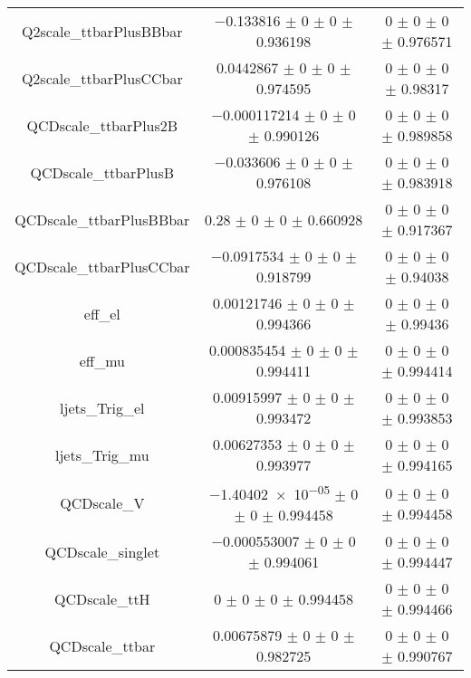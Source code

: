 \begin{table}
\begin{tabular}{ccc}
Q2scale\_ttbarPlusBBbar & \num{-0.133816} $\pm$ \num{0} $\pm$ \num{0} $\pm$ \num{0.936198} & \num{0} $\pm$ \num{0} $\pm$ \num{0} $\pm$ \num{0.976571}\\
Q2scale\_ttbarPlusCCbar & \num{0.0442867} $\pm$ \num{0} $\pm$ \num{0} $\pm$ \num{0.974595} & \num{0} $\pm$ \num{0} $\pm$ \num{0} $\pm$ \num{0.98317}\\
QCDscale\_ttbarPlus2B & \num{-0.000117214} $\pm$ \num{0} $\pm$ \num{0} $\pm$ \num{0.990126} & \num{0} $\pm$ \num{0} $\pm$ \num{0} $\pm$ \num{0.989858}\\
QCDscale\_ttbarPlusB & \num{-0.033606} $\pm$ \num{0} $\pm$ \num{0} $\pm$ \num{0.976108} & \num{0} $\pm$ \num{0} $\pm$ \num{0} $\pm$ \num{0.983918}\\
QCDscale\_ttbarPlusBBbar & \num{0.28} $\pm$ \num{0} $\pm$ \num{0} $\pm$ \num{0.660928} & \num{0} $\pm$ \num{0} $\pm$ \num{0} $\pm$ \num{0.917367}\\
QCDscale\_ttbarPlusCCbar & \num{-0.0917534} $\pm$ \num{0} $\pm$ \num{0} $\pm$ \num{0.918799} & \num{0} $\pm$ \num{0} $\pm$ \num{0} $\pm$ \num{0.94038}\\
eff\_el & \num{0.00121746} $\pm$ \num{0} $\pm$ \num{0} $\pm$ \num{0.994366} & \num{0} $\pm$ \num{0} $\pm$ \num{0} $\pm$ \num{0.99436}\\
eff\_mu & \num{0.000835454} $\pm$ \num{0} $\pm$ \num{0} $\pm$ \num{0.994411} & \num{0} $\pm$ \num{0} $\pm$ \num{0} $\pm$ \num{0.994414}\\
ljets\_Trig\_el & \num{0.00915997} $\pm$ \num{0} $\pm$ \num{0} $\pm$ \num{0.993472} & \num{0} $\pm$ \num{0} $\pm$ \num{0} $\pm$ \num{0.993853}\\
ljets\_Trig\_mu & \num{0.00627353} $\pm$ \num{0} $\pm$ \num{0} $\pm$ \num{0.993977} & \num{0} $\pm$ \num{0} $\pm$ \num{0} $\pm$ \num{0.994165}\\
QCDscale\_V & \num{-1.40402e-05} $\pm$ \num{0} $\pm$ \num{0} $\pm$ \num{0.994458} & \num{0} $\pm$ \num{0} $\pm$ \num{0} $\pm$ \num{0.994458}\\
QCDscale\_singlet & \num{-0.000553007} $\pm$ \num{0} $\pm$ \num{0} $\pm$ \num{0.994061} & \num{0} $\pm$ \num{0} $\pm$ \num{0} $\pm$ \num{0.994447}\\
QCDscale\_ttH & \num{0} $\pm$ \num{0} $\pm$ \num{0} $\pm$ \num{0.994458} & \num{0} $\pm$ \num{0} $\pm$ \num{0} $\pm$ \num{0.994466}\\
QCDscale\_ttbar & \num{0.00675879} $\pm$ \num{0} $\pm$ \num{0} $\pm$ \num{0.982725} & \num{0} $\pm$ \num{0} $\pm$ \num{0} $\pm$ \num{0.990767}\\

\end{tabular}
\end{table}
